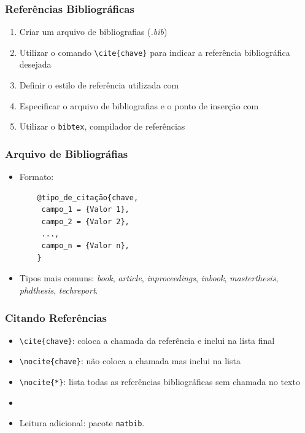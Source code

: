 \begin{frame}[fragile]
\frametitle{Referências Bibliográficas}

\begin{enumerate}
  \item Criar um arquivo de bibliografias (\textit{.bib})
  \item Utilizar o comando \verb|\cite{chave}| para indicar a referência bibliográfica desejada
  \item Definir o estilo de referência utilizada com \verb||
  \item Especificar o arquivo de bibliografias e o ponto de inserção com
  \verb||
  \item Utilizar o \texttt{bibtex}, compilador de referências
\end{enumerate}
 
\end{frame}

\begin{frame}[fragile]
\frametitle{Arquivo de Bibliográfias}

\begin{itemize}
  \item Formato:
  \begin{framed}
  \begin{verbatim}
	@tipo_de_citação{chave, 
	 campo_1 = {Valor 1},
	 campo_2 = {Valor 2},
	 ...,
     campo_n = {Valor n},
	}
  \end{verbatim}
  \end{framed}
  \item Tipos mais comuns: \textit{book}, \textit{article}, \textit{inproceedings},
  \textit{inbook}, \textit{masterthesis},
  \textit{phdthesis}, \textit{techreport}.
\end{itemize}
 
\end{frame}

\begin{frame}[fragile]
\frametitle{Citando Referências}


\begin{itemize}
  \item \verb|\cite{chave}|: coloca a chamada da referência e inclui na lista final
  \item \verb|\nocite{chave}|: não coloca a chamada mas inclui na lista
  \item \verb|\nocite{*}|: lista todas as referências bibliográficas sem chamada no texto
  \item[] 
  \item Leitura adicional: pacote \texttt{natbib}.
\end{itemize}
 
\end{frame}

